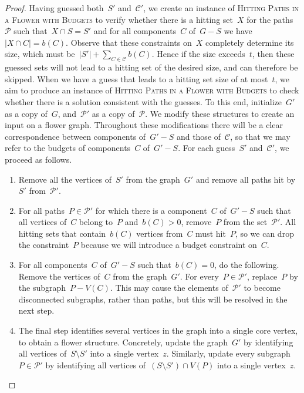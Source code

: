 \let\accentvec\vec  \documentclass{llncs}
\newcommand{\C}{{\mathcal{C}}}
\renewcommand{\P}{\ensuremath{\mathcal{P}}\xspace}
\renewcommand{\C}{\ensuremath{\mathcal{C}}\xspace}
\newcommand{\HitPathsInFlower}{\textsc{Hitting Paths in a Flower with Budgets}\xspace}
\begin{document}
\begin{proof}
Having guessed both~$S'$ and~$\C'$, we create an instance of \HitPathsInFlower to verify whether there is a hitting set~$X$ for the paths~$\P$ such that~$X \cap S = S'$ and for all components~$C$ of~$G-S$ we have~$|X \cap C| = b(C)$. Observe that these constraints on~$X$ completely determine its size, which must be~$|S'| + \sum _{C \in \C} b(C)$. Hence if the size exceeds~$t$, then these guessed sets will not lead to a hitting set of the desired size, and can therefore be skipped. When we have a guess that leads to a hitting set size of at most~$t$, we aim to produce an instance of \HitPathsInFlower to check whether there is a solution consistent with the guesses. To this end, initialize~$G'$ as a copy of~$G$, and~$\P'$ as a copy of~$\P$. We modify these structures to create an input on a flower graph. Throughout these modifications there will be a clear correspondence between components of~$G' - S$ and those of~$\C$, so that we may refer to the budgets of components~$C$ of~$G' - S$. For each guess~$S'$ and~$\C'$, we proceed as follows.

\begin{enumerate}
	\item Remove all the vertices of~$S'$ from the graph~$G'$ and remove all paths hit by~$S'$ from~$\P'$.\label{flower:step:removeshitpaths}
	\item For all paths~$P \in \P'$ for which there is a component~$C$ of~$G' - S$ such that all vertices of~$C$ belong to~$P$ and~$b(C) > 0$, remove~$P$ from the set~$\P'$. All hitting sets that contain~$b(C)$ vertices from~$C$ must hit~$P$, so we can drop the constraint~$P$ because we will introduce a budget constraint on~$C$.\label{flower:step:removebudgethitpaths}
	\item For all components~$C$ of~$G' - S$ such that~$b(C) = 0$, do the following. Remove the vertices of~$C$ from the graph~$G'$. For every~$P \in \P'$, replace~$P$ by the subgraph~$P - V(C)$. This may cause the elements of~$\P'$ to become disconnected subgraphs, rather than paths, but this will be resolved in the next step.\label{flower:step:splitpaths}
	\item The final step identifies several vertices in the graph into a single core vertex, to obtain a flower structure. Concretely, update the graph~$G'$ by identifying all vertices of~$S \setminus S'$ into a single vertex~$z$. Similarly, update every subgraph~$P \in \P'$ by identifying all vertices of~$(S \setminus S') \cap V(P)$ into a single vertex~$z$.\label{flower:step:merge}
\end{enumerate}


\end{proof}
\end{document}
